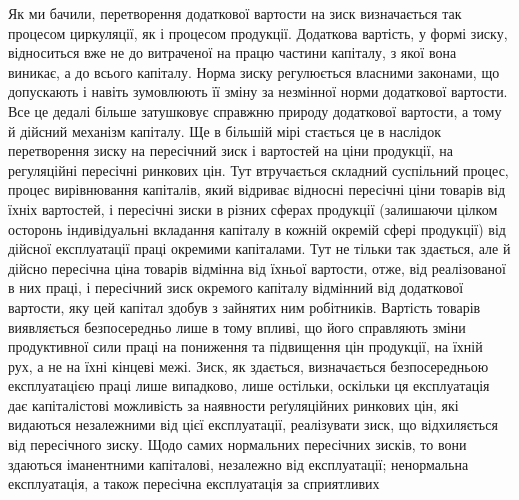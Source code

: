 Як ми бачили, перетворення додаткової вартости на зиск визначається так
процесом циркуляції, як і процесом продукції. Додаткова вартість, у формі зиску,
відноситься вже не до витраченої на працю частини капіталу, з якої вона виникає,
а до всього капіталу. Норма зиску регулюється власними законами, що
допускають і навіть зумовлюють її зміну за незмінної норми додаткової
вартости. Все це дедалі більше затушковує справжню природу додаткової вартости,
а тому й дійсний механізм капіталу. Ще в більшій мірі стається це
в наслідок перетворення зиску на пересічний зиск і вартостей на ціни продукції,
на регуляційні пересічні ринкових цін. Тут втручається складний суспільний
процес, процес вирівнювання капіталів, який відриває відносні пересічні
ціни товарів від їхніх вартостей, і пересічні зиски в різних сферах продукції
(залишаючи цілком осторонь індивідуальні вкладання капіталу в кожній окремій
сфері продукції) від дійсної експлуатації праці окремими капіталами. Тут не
тільки так здається, але й дійсно пересічна ціна товарів відмінна від їхньої
вартости, отже, від реалізованої в них праці, і пересічний зиск окремого капіталу
відмінний від додаткової вартости, яку цей капітал здобув з зайнятих ним
робітників. Вартість товарів виявляється безпосередньо лише в тому впливі, що
його справляють зміни продуктивної сили праці на пониження та підвищення цін
продукції, на їхній рух, а не на їхні кінцеві межі. Зиск, як здається, визначається
безпосередньою експлуатацією праці лише випадково, лише остільки,
оскільки ця експлуатація дає капіталістові можливість за наявности реґуляційних
ринкових цін, які видаються незалежними від цієї експлуатації, реалізувати
зиск, що відхиляється від пересічного зиску. Щодо самих нормальних пересічних
зисків, то вони здаються іманентними капіталові, незалежно від експлуатації;
ненормальна експлуатація, а також пересічна експлуатація за сприятливих
\parbreak{}  %
